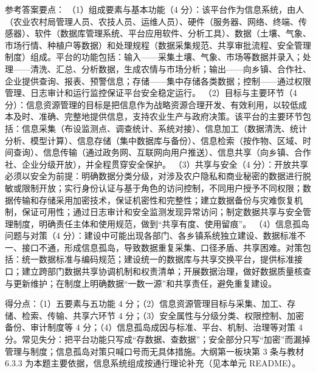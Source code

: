 \documentclass[a4paper,11pt]{article}
\begin{document}
\q 参考答案要点：
（1）组成要素与基本功能（4 分）：该平台作为信息系统，由人（农业农村局管理人员、农技人员、运维人员）、硬件（服务器、网络、终端、传感器）、软件（数据库管理系统、平台应用软件、分析工具）、数据（土壤、气象、市场行情、种植户等数据）和处理规程（数据采集规范、共享审批流程、安全管理制度）组成。平台的功能包括：输入——采集土壤、气象、市场等数据并录入；处理——清洗、汇总、分析数据，生成农情与市场分析；输出——向乡镇、合作社、企业提供查询、报表、预警信息；存储——集中存储各类数据；控制——通过权限管理、日志审计和运行监控保证平台安全稳定运行。
（2）目标与主要环节（4 分）：信息资源管理的目标是把信息作为战略资源合理开发、有效利用，以较低成本及时、准确、完整地提供信息，支持农业生产与政府决策。该平台的主要环节包括：信息采集（布设监测点、调查统计、系统对接）、信息加工（数据清洗、统计分析、模型计算）、信息存储（集中数据库与备份）、信息检索（按作物、区域、时间查询）、信息传输（通过政务网、互联网向用户推送）、信息共享（向乡镇、合作社、企业分级开放），并全程贯穿安全保护。
（3）共享与安全（4 分）：开放共享必须以安全为前提：明确数据分类分级，对涉及农户隐私和商业秘密的数据进行脱敏或限制开放；实行身份认证与基于角色的访问控制，不同用户授予不同权限；数据传输和存储采用加密技术，保证机密性和完整性；建立数据备份与灾难恢复机制，保证可用性；通过日志审计和安全监测发现异常访问；制定数据共享与安全管理制度，明确责任主体和使用规范，做到“共享有度、使用留痕”。
（4）信息孤岛问题与对策（4 分）：建设中可能出现各部门、各乡镇系统独立建设、数据标准不一、接口不通，形成信息孤岛，导致数据重复采集、口径矛盾、共享困难。对策包括：统一数据标准与编码规范；建设统一的数据库与共享交换平台，提供标准接口；建立跨部门数据共享协调机制和权责清单；开展数据治理，做好数据质量核查与更新维护；在制度上明确数据“一数一源”和共享责任，避免重复建设。
\begin{analysis}得分点：（1）五要素与五功能 4 分；（2）信息资源管理目标与采集、加工、存储、检索、传输、共享六环节 4 分；（3）安全属性与分级分类、权限控制、加密备份、审计制度等 4 分；（4）信息孤岛成因与标准、平台、机制、治理等对策 4 分。常见失分：把平台功能只写成“存数据、查数据”；安全部分只写“加密”而漏掉管理与制度；信息孤岛对策只喊口号而无具体措施。大纲第一板块第 3 条与教材 6.3.3 为本题主要依据，信息系统组成按通行理论补充（见本单元 README）。\end{analysis}
\end{document}
